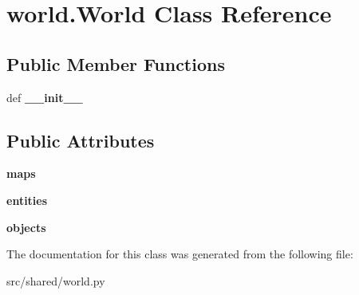 \hypertarget{classworld_1_1_world}{\section{world.\-World \-Class \-Reference}
\label{classworld_1_1_world}
}
\subsection*{\-Public \-Member \-Functions}
\begin{DoxyCompactItemize}
\item 
\hypertarget{classworld_1_1_world_a4351253668240be9d3a0d5bc2f1aa18f}{def {\bfseries \-\_\-\-\_\-init\-\_\-\-\_\-}}\label{classworld_1_1_world_a4351253668240be9d3a0d5bc2f1aa18f}

\end{DoxyCompactItemize}
\subsection*{\-Public \-Attributes}
\begin{DoxyCompactItemize}
\item 
\hypertarget{classworld_1_1_world_ae5d81046b959889536deca60b2df94a4}{{\bfseries maps}}\label{classworld_1_1_world_ae5d81046b959889536deca60b2df94a4}

\item 
\hypertarget{classworld_1_1_world_ae2c39feccf4fcd06f11f8398e42505a4}{{\bfseries entities}}\label{classworld_1_1_world_ae2c39feccf4fcd06f11f8398e42505a4}

\item 
\hypertarget{classworld_1_1_world_a144e6d2a815857b12be4cd2bf4ac2c44}{{\bfseries objects}}\label{classworld_1_1_world_a144e6d2a815857b12be4cd2bf4ac2c44}

\end{DoxyCompactItemize}


\-The documentation for this class was generated from the following file\-:\begin{DoxyCompactItemize}
\item 
src/shared/world.\-py\end{DoxyCompactItemize}
